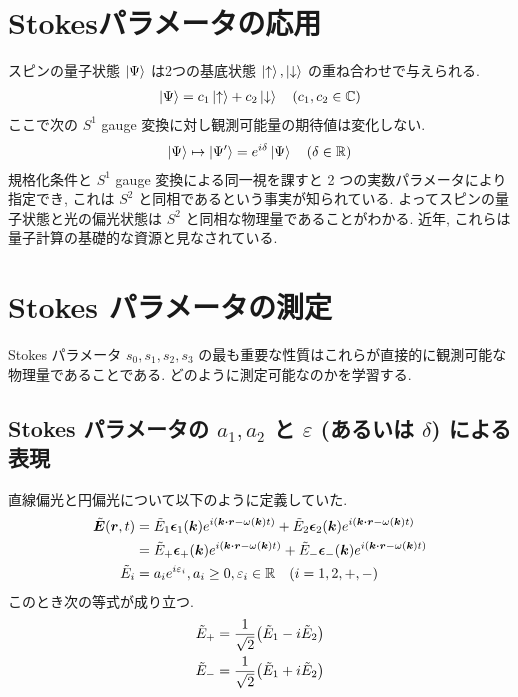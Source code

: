 \documentclass[uplatex,dvipdfmx,a4paper,11pt]{jlreq}
\newcommand{\CC}{\mathbb{C}}
\newcommand{\RR}{\mathbb{R}}
\newcommand{\EE}{\bm{E}}
\newcommand{\rr}{\bm{r}}
\newcommand{\kk}{\bm{k}}
\theoremstyle{definition}
\begin{document}
\section{Stokesパラメータの応用}
スピンの量子状態 $\ket{\Psi}$ は2つの基底状態 $\ket{\uparrow}, \ket{\downarrow}$ の重ね合わせで与えられる.
\begin{align}
  \ket{\Psi} = c_1\ket{\uparrow} + c_2\ket{\downarrow} \quad (c_1, c_2 \in \CC)
\end{align}
ここで次の $S^1$ gauge 変換に対し観測可能量の期待値は変化しない.
\begin{align}
  \ket{\Psi} \mapsto \ket{\Psi'} = e^{\ii\delta}\ket{\Psi} \quad (\delta\in\RR)
\end{align}
規格化条件と $S^1$ gauge 変換による同一視を課すと 2 つの実数パラメータにより指定でき, これは $S^2$ と同相であるという事実が知られている. よってスピンの量子状態と光の偏光状態は $S^2$ と同相な物理量であることがわかる. 近年, これらは量子計算の基礎的な資源と見なされている.

\section{Stokes パラメータの測定}
Stokes パラメータ $s_0, s_1, s_2, s_3$ の最も重要な性質はこれらが直接的に観測可能な物理量であることである. どのように測定可能なのかを学習する.
\subsection{Stokes パラメータの $a_1, a_2$ と $\varepsilon$ (あるいは $\delta$) による表現}
直線偏光と円偏光について以下のように定義していた.
\begin{align}
  \tilde{\EE}(\rr, t) & = \tilde{E}_1\ee_1(\kk)e^{\ii(\kk\vdot\rr - \omega(\kk)t)} + \tilde{E}_2\ee_2(\kk)e^{\ii(\kk\vdot\rr - \omega(\kk)t)} \label{ET line def}   \\
                      & = \tilde{E}_+\ee_+(\kk)e^{\ii(\kk\vdot\rr - \omega(\kk)t)} + \tilde{E}_-\ee_-(\kk)e^{\ii(\kk\vdot\rr - \omega(\kk)t)} \label{ET circle def} \\
  \tilde{E}_i         & = a_ie^{\ii\varepsilon_i}, a_i \geq 0, \varepsilon_i\in\RR \quad (i = 1, 2, +, -)
\end{align}
このとき次の等式が成り立つ.
\begin{align}
  \tilde{E}_+ & = \frac{1}{\sqrt{2}}\qty(\tilde{E}_1 - i\tilde{E}_2) \\
  \tilde{E}_- & = \frac{1}{\sqrt{2}}\qty(\tilde{E}_1 + i\tilde{E}_2)
\end{align}
\\
\end{document}
